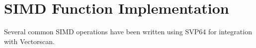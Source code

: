 %
\chapter{SIMD Function Implementation}

Several common SIMD operations have been written using SVP64 for integration
with Vectorscan.



